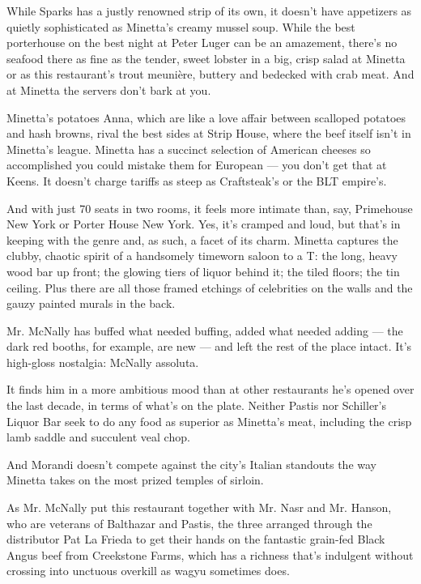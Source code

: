 While Sparks has a justly renowned strip of its own, it doesn't have
appetizers as quietly sophisticated as Minetta's creamy mussel soup.
While the best porterhouse on the best night at Peter Luger can be an
amazement, there's no seafood there as fine as the tender, sweet lobster
in a big, crisp salad at Minetta or as this restaurant's trout meunière,
buttery and bedecked with crab meat. And at Minetta the servers don't
bark at you.

Minetta's potatoes Anna, which are like a love affair between scalloped
potatoes and hash browns, rival the best sides at Strip House, where the
beef itself isn't in Minetta's league. Minetta has a succinct selection
of American cheeses so accomplished you could mistake them for European
--- you don't get that at Keens. It doesn't charge tariffs as steep as
Craftsteak's or the BLT empire's.

And with just 70 seats in two rooms, it feels more intimate than, say,
Primehouse New York or Porter House New York. Yes, it's cramped and
loud, but that's in keeping with the genre and, as such, a facet of its
charm. Minetta captures the clubby, chaotic spirit of a handsomely
timeworn saloon to a T: the long, heavy wood bar up front; the glowing
tiers of liquor behind it; the tiled floors; the tin ceiling. Plus there
are all those framed etchings of celebrities on the walls and the gauzy
painted murals in the back.

Mr. McNally has buffed what needed buffing, added what needed adding ---
the dark red booths, for example, are new --- and left the rest of the
place intact. It's high-gloss nostalgia: McNally assoluta.

It finds him in a more ambitious mood than at other restaurants he's
opened over the last decade, in terms of what's on the plate. Neither
Pastis nor Schiller's Liquor Bar seek to do any food as superior as
Minetta's meat, including the crisp lamb saddle and succulent veal chop.

And Morandi doesn't compete against the city's Italian standouts the way
Minetta takes on the most prized temples of sirloin.

As Mr. McNally put this restaurant together with Mr. Nasr and Mr.
Hanson, who are veterans of Balthazar and Pastis, the three arranged
through the distributor Pat La Frieda to get their hands on the
fantastic grain-fed Black Angus beef from Creekstone Farms, which has a
richness that's indulgent without crossing into unctuous overkill as
wagyu sometimes does.

